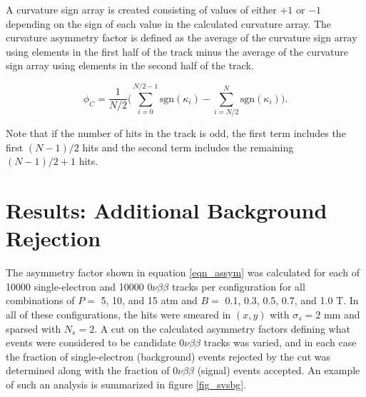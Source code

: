 \documentclass{JINST}
\begin{document}
A curvature sign array is created consisting of values of either $+1$ or $-1$ depending on the sign of each value in the calculated curvature array.  The curvature asymmetry factor is defined as the average of the curvature sign array using elements in the first half of the track minus the average of the curvature sign array using elements in the second half of the track.

\begin{equation}\label{eqn_assym}
\phi_{C} = \frac{1}{N/2}\Biggl(\sum_{i=0}^{N/2-1}\mathrm{sgn}(\kappa_{i}) - \sum_{i=N/2}^{N}\mathrm{sgn}(\kappa_{i})\Biggr).
\end{equation}

\noindent Note that if the number of hits in the track is odd, the first term includes the first $(N-1)/2$ hits and
the second term includes the remaining $(N-1)/2 + 1$ hits.

\section{Results: Additional Background Rejection}
The asymmetry factor shown in equation \ref{eqn_assym} was calculated for each of 10000 single-electron and 10000 $0\nu\beta\beta$ tracks per configuration for all combinations of $P =$ 5, 10, and 15 atm and $B =$ 0.1, 0.3, 0.5, 0.7, and 1.0 T.  In all of these configurations, the hits were smeared in $(x,y)$ with $\sigma_{s} = 2$ mm and sparsed with $N_{s} = 2$.  A cut on the calculated asymmetry factors defining what events were considered to be candidate $0\nu\beta\beta$ tracks was varied, and in each case the fraction of single-electron (background) events rejected by the cut was determined along with the fraction of $0\nu\beta\beta$ (signal) events accepted.  An example of such an analysis is summarized in figure \ref{fig_svsbg}.
\end{document}
